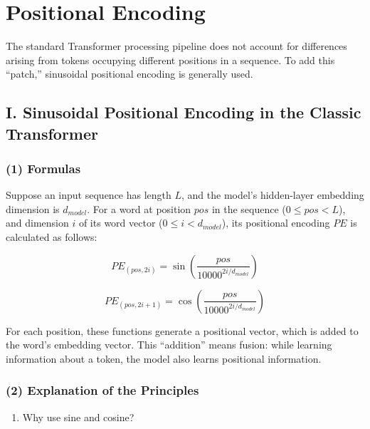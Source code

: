 \setcounter{section}{3}

\hypertarget{positional-encoding}{%
\section{Positional Encoding}\label{positional-encoding}}

The standard Transformer processing pipeline does not account for differences arising from tokens occupying different positions in a sequence. To add this ``patch,'' sinusoidal positional encoding is generally used.

\hypertarget{i.-sinusoidal-positional-encoding-in-the-classic-transformer}{%
\subsection{I. Sinusoidal Positional Encoding in the Classic Transformer}\label{i.-sinusoidal-positional-encoding-in-the-classic-transformer}}

\hypertarget{formulas}{%
\subsubsection{(1) Formulas}\label{formulas}}

Suppose an input sequence has length \(L\), and the model's hidden-layer embedding dimension is \(d_{model}\). For a word at position \(pos\) in the sequence (\(0 \le pos < L\)), and dimension \(i\) of its word vector (\(0 \le i < d_{model}\)), its positional encoding \(PE\) is calculated as follows:

\[
PE_{(pos,2i)}=\sin\left(\frac{pos}{10000^{2i/d_{model}}}\right)
\]

\[
PE_{(pos,2i+1)}=\cos\left(\frac{pos}{10000^{2i/d_{model}}}\right)
\]

For each position, these functions generate a positional vector, which is added to the word's embedding vector. This ``addition'' means fusion: while learning information about a token, the model also learns positional information.

\hypertarget{explanation-of-the-principles}{%
\subsubsection{(2) Explanation of the Principles}\label{explanation-of-the-principles}}

\begin{enumerate}
\def\labelenumi{\arabic{enumi}.}
\tightlist
\item
  Why use sine and cosine?
\end{enumerate}

